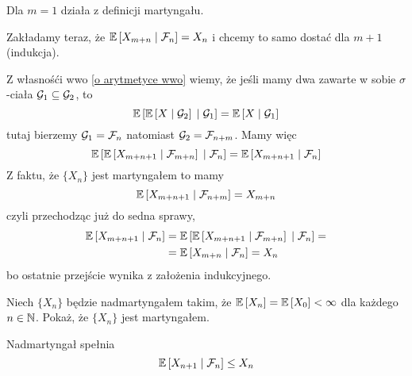 \begin{solution}
  Dla $m=1$ działa z definicji martyngału.

  Zakładamy teraz, że $\expected{X_{m+n}}{\set{F}_n}=X_n$ i chcemy to samo dostać dla $m+1$ (indukcja).

  Z własnośći wwo \ref{o arytmetyce wwo} wiemy, że jeśli mamy dwa zawarte w sobie $\sigma$-ciała $\mathcal{G}_1\subseteq\mathcal{G}_2$, to
  $$\expected{\expected{X}{\set{G}_2}}{\set{G}_1}=\expected{X}{\set{G}_1}$$
  tutaj bierzemy $\mathcal{G}_1=\mathcal{F}_n$ natomiast $\mathcal{G}_2=\mathcal{F}_{n+m}$. Mamy więc
  $$\expected{\expected{X_{m+n+1}}{\set{F}_{m+n}}}{\set{F}_n}=\expected{X_{m+n+1}}{\set{F}_n}$$
  Z faktu, że $\{X_n\}$ jest martyngałem to mamy
  $$\expected{X_{m+n+1}}{\set{F}_{n+m}}=X_{m+n}$$
  czyli przechodząc już do sedna sprawy,
  \begin{align*}
    \expected{X_{m+n+1}}{\set{F}_n}&=\expected{\expected{X_{m+n+1}}{\set{F}_{m+n}}}{\set{F}_n}=\\ 
                                   &=\expected{X_{m+n}}{\set{F}_n}=X_n
  \end{align*}
  bo ostatnie przejście wynika z założenia indukcyjnego.
\end{solution}

\begin{problem}
  Niech $\{X_n\}$ będzie nadmartyngałem takim, że $\expected{X_n}=\expected{X_0}<\infty$ dla każdego $n\in\operatorname{\mathbb{N}}$. Pokaż, że $\{X_n\}$ jest martyngałem.
\end{problem}

\begin{solution}
  Nadmartyngał spełnia
  $$\expected{X_{n+1}}{\set{F}_n}\leq X_n$$

\end{solution}
